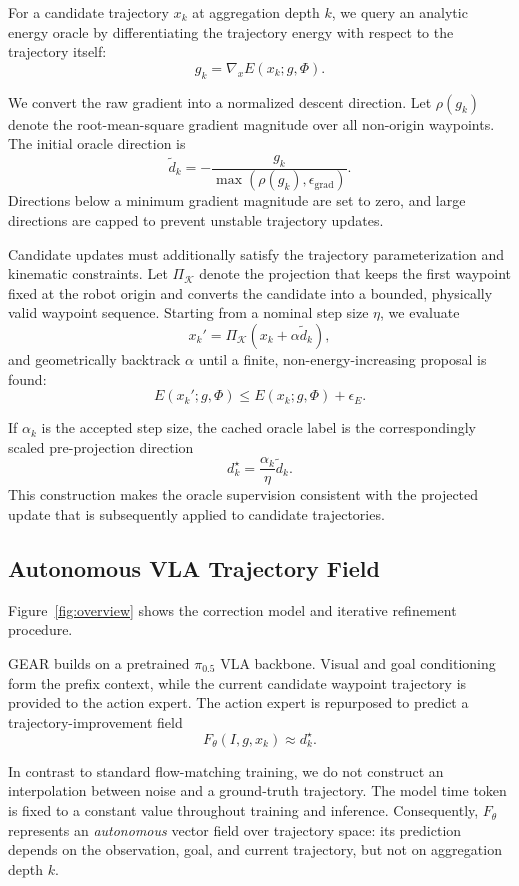 \documentclass[letterpaper, 10 pt, conference]{ieeeconf}  %
\begin{document}
For a candidate trajectory $x_k$ at aggregation depth $k$, we query an analytic
energy oracle by differentiating the trajectory energy with respect to the
trajectory itself:
\[
    g_k
    =
    \nabla_x E(x_k;g,\Phi).
\]

We convert the raw gradient into a normalized descent direction. Let
$\rho(g_k)$ denote the root-mean-square gradient magnitude over all non-origin
waypoints. The initial oracle direction is
\[
    \tilde d_k
    =
    -\frac{g_k}
    {\max\left(\rho(g_k),\epsilon_{\mathrm{grad}}\right)}.
\]
Directions below a minimum gradient magnitude are set to zero, and large
directions are capped to prevent unstable trajectory updates.

Candidate updates must additionally satisfy the trajectory parameterization
and kinematic constraints. Let $\Pi_{\mathcal K}$ denote the projection that
keeps the first waypoint fixed at the robot origin and converts the candidate
into a bounded, physically valid waypoint sequence. Starting from a nominal
step size $\eta$, we evaluate
\[
    x_k'
    =
    \Pi_{\mathcal K}
    \left(
        x_k + \alpha \tilde d_k
    \right),
\]
and geometrically backtrack $\alpha$ until a finite, non-energy-increasing
proposal is found:
\[
    E(x_k';g,\Phi)
    \leq
    E(x_k;g,\Phi) + \epsilon_E.
\]

If $\alpha_k$ is the accepted step size, the cached oracle label is the
correspondingly scaled pre-projection direction
\[
    d_k^\star
    =
    \frac{\alpha_k}{\eta}\tilde d_k.
\]
This construction makes the oracle supervision consistent with the projected
update that is subsequently applied to candidate trajectories.

\subsection{Autonomous VLA Trajectory Field}
\label{sec:field}



Figure~\ref{fig:overview} shows the correction model and iterative refinement procedure.

GEAR builds on a pretrained $\pi_{0.5}$ VLA backbone. Visual and goal
conditioning form the prefix context, while the current candidate waypoint
trajectory is provided to the action expert. The action expert is repurposed
to predict a trajectory-improvement field
\[
    F_\theta(I,g,x_k)
    \approx
    d_k^\star.
\]

In contrast to standard flow-matching training, we do not construct an
interpolation between noise and a ground-truth trajectory. The model time
token is fixed to a constant value throughout training and inference.
Consequently, $F_\theta$ represents an \emph{autonomous} vector field over
trajectory space: its prediction depends on the observation, goal, and
current trajectory, but not on aggregation depth $k$.
\end{document}
